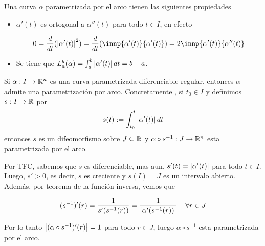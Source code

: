 \documentclass{article}
\begin{document}
\noindent Una curva $\alpha$ parametrizada por el arco tienen las siguientes propiedades

\begin{itemize}
    \item $\alpha'(t)$ es ortogonal a $\alpha''(t)$ para todo $t\in I$, en efecto
    
    \begin{equation*}
        0=\dv{}{t}(\abs{\alpha'(t)}^{2})=\dv{}{t}(\innp{\alpha'(t)}{\alpha'(t)})=2\innp{\alpha'(t)}
        {\alpha''(t)}
    \end{equation*}

    \item Se tiene que $L_{a}^{b}(\alpha)=\int_{a}^{b}\left|\alpha'(t) \right|dt=b-a$.
\end{itemize}

\begin{teo}
    Si $\alpha: I\to\mathbb{R}^{n}$ es una curva parametrizada diferenciable regular, entonces $\alpha$
    admite una parametrización por arco. Concretamente , si $t_{0}\in I$ y definimos $s: I\to\mathbb{R}$ 
    por
    \begin{equation*}
        s(t):=\int_{t_{0}}^{t}\left|\alpha'(t) \right|dt
    \end{equation*}
    entonces $s$ es un difeomorfismo sobre $J\subseteq\mathbb{R}$ y $\alpha\circ s^{-1}:J\to\mathbb{R}^{n}$ esta
    parametrizada por el arco.
\end{teo}

\begin{dem}
    Por TFC, sabemos que $s$ es diferenciable, mas aun, $s'(t)=\left|\alpha'(t) \right|$ para todo 
    $t\in I$. Luego, $s'>0$, es decir, $s$ es creciente y $s(I)=J$ es un intervalo abierto. Además,
    por teorema de la función inversa, vemos que

    \begin{equation*}
        (s^{-1})'(r)=\frac{1}{s'(s^{-1}(r))}=\frac{1}{\left|\alpha'(s^{-1}(r)) \right|}\hspace{4mm}
        \forall r\in J
    \end{equation*}

    \noindent Por lo tanto $\left|(\alpha\circ s^{-1})'(r) \right|=1$ para todo $r\in J$, luego 
    $\alpha\circ s^{-1}$ esta parametrizada por el arco.
\end{dem}
\end{document}
